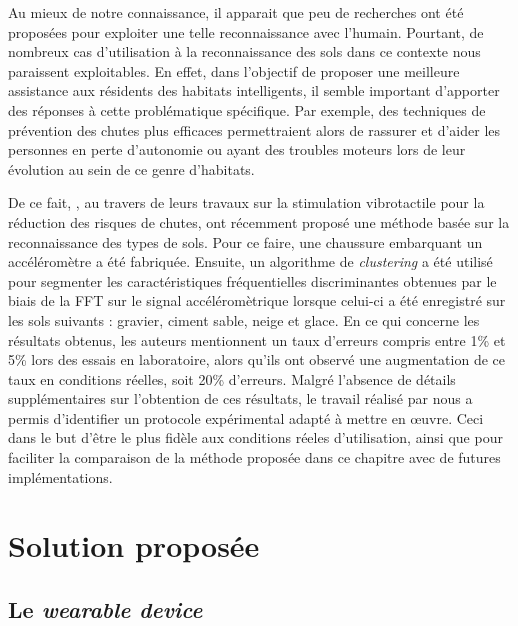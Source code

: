 Au mieux de notre connaissance, il apparait que peu de recherches ont été proposées pour exploiter une telle reconnaissance avec l'humain. Pourtant, de nombreux cas d'utilisation à la reconnaissance des sols dans ce contexte nous paraissent exploitables. En effet, dans l'objectif de proposer une meilleure assistance aux résidents des habitats intelligents, il semble important d'apporter des réponses à cette problématique spécifique. Par exemple, des techniques de prévention des chutes plus efficaces permettraient alors de rassurer et d'aider les personnes en perte d'autonomie ou ayant des troubles moteurs lors de leur évolution au sein de ce genre d'habitats.

De ce fait, \cite{Otis2016}, au travers de leurs travaux sur la stimulation vibrotactile pour la réduction des risques de chutes, ont récemment proposé une méthode basée sur la reconnaissance des types de sols. Pour ce faire, une chaussure embarquant un accéléromètre a été fabriquée. Ensuite, un algorithme de \textit{clustering} a été utilisé pour segmenter les caractéristiques fréquentielles discriminantes obtenues par le biais de la \acs{FFT} sur le signal accéléromètrique lorsque celui-ci a été enregistré sur les sols suivants : gravier, ciment sable, neige et glace. En ce qui concerne les résultats obtenus, les auteurs mentionnent un taux d'erreurs compris entre 1\% et 5\% lors des essais en laboratoire, alors qu'ils ont observé une augmentation de ce taux en conditions réelles, soit 20\% d'erreurs. Malgré l'absence de détails supplémentaires sur l'obtention de ces résultats, le travail réalisé par \cite{Otis2016} nous a permis d'identifier un protocole expérimental adapté à mettre en \oe{}uvre. Ceci dans le but d'être le plus fidèle aux conditions réeles d'utilisation, ainsi que pour faciliter la comparaison de la méthode proposée dans ce chapitre avec de futures implémentations.

\section{Solution proposée}

\subsection{Le \textit{wearable device}}

